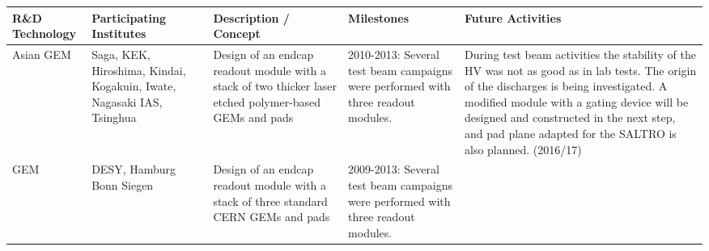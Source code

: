 \thispagestyle{empty}
\begin{landscape}
    \centering
    \begin{adjustbox}{max width=1.1\textwidth,totalheight=1\textheight}
\begin{tabularx}{2\textheight}{lXXXX}
    \toprule
    R\&D Technology & Participating Institutes & Description / Concept & Milestones & Future Activities \\
    \midrule
        Asian GEM &
        Saga, KEK, Hiroshima, \newline Kindai, Kogakuin, Iwate, \newline
    Nagasaki IAS, Tsinghua &Design of an endcap readout module with a stack of
    two thicker laser etched polymer-based GEMs and pads  & 2010-2013: Several
    test beam campaigns were performed with three readout modules. & During test beam activities the stability of the HV was not
as good as in lab tests. The origin of the discharges is being
investigated. A modified module with a gating device will be
designed and constructed in the next step, and pad
plane adapted for the SALTRO is also planned. (2016/17) \\
    \midrule
        GEM &
        DESY, Hamburg \newline Bonn \newline Siegen &
        Design of an endcap readout module with a stack
of three standard CERN GEMs and pads&2009-2013: Several test beam campaigns were performed with
three readout modules.


\end{tabularx}
\end{adjustbox}
\end{landscape}
